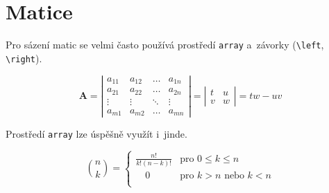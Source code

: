 \documentclass[a4paper, 11pt, twocolumn]{article}
\begin{document}
        \section{Matice}
        Pro sázení matic se velmi často používá prostředí \texttt{array} a~závorky (\verb|\left|, \verb|\right|).
        
        $$
		\mathbf{A} =
		\left|
		\begin{array}{cccc}
			a_{11} & a_{12} & \ldots & a_{1n} \\
			a_{21} & a_{22} & \ldots & a_{2n} \\
			\vdots & \vdots & \ddots & \vdots \\
			a_{m1} & a_{m2} & \ldots & a_{mn}
		\end{array}
		\right|
		=
		\left|
		\begin{array}{cc}
			t & u \\
			v & w
		\end{array}
		\right|
		= tw - uv
	    $$
	    
	    Prostředí \texttt{array} lze úspěšně využít i~jinde.
	    
	    $$
		\binom{n}{k} =
		\left\{
		\begin{array}{ll}
			\frac{n!}{k! (n - k)!} & \text{pro } 0 \leq k \leq n \\
			 \quad 0 & \text{pro } k > n \text{ nebo } k < n\\
		\end{array}
		\right.
    	$$
\end{document}
